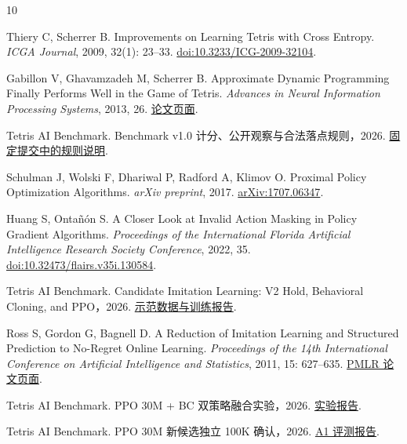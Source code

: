 \documentclass[UTF8,fontset=none,zihao=-4,a4paper]{ctexart}
\newcommand{\1}{\mathbf{1}}
\begin{document}
\begin{thebibliography}{10}
\small

Thiery C, Scherrer B.
Improvements on Learning Tetris with Cross Entropy.
\textit{ICGA Journal}, 2009, 32(1): 23--33.
\href{https://doi.org/10.3233/ICG-2009-32104}{doi:10.3233/ICG-2009-32104}.

Gabillon V, Ghavamzadeh M, Scherrer B.
Approximate Dynamic Programming Finally Performs Well in the Game of Tetris.
\textit{Advances in Neural Information Processing Systems}, 2013, 26.
\href{https://papers.neurips.cc/paper_files/paper/2013/hash/7504adad8bb96320eb3afdd4df6e1f60-Abstract.html}{论文页面}.

Tetris AI Benchmark.
Benchmark v1.0 计分、公开观察与合法落点规则，2026.
\href{https://github.com/u-wyh/tetris-ai-benchmark/blob/c1395ccd7ecc0908ddf5289d1887978e1b87c0b5/tetris-game/README.md}{固定提交中的规则说明}.

Schulman J, Wolski F, Dhariwal P, Radford A, Klimov O.
Proximal Policy Optimization Algorithms.
\textit{arXiv preprint}, 2017.
\href{https://arxiv.org/abs/1707.06347}{arXiv:1707.06347}.

Huang S, Onta\~n\'on S.
A Closer Look at Invalid Action Masking in Policy Gradient Algorithms.
\textit{Proceedings of the International Florida Artificial Intelligence Research Society Conference}, 2022, 35.
\href{https://doi.org/10.32473/flairs.v35i.130584}{doi:10.32473/flairs.v35i.130584}.

Tetris AI Benchmark.
Candidate Imitation Learning: V2 Hold, Behavioral Cloning, and PPO，2026.
\href{https://github.com/u-wyh/tetris-ai-benchmark/blob/c1395ccd7ecc0908ddf5289d1887978e1b87c0b5/reports/experiments/candidate_imitation_learning.md}{示范数据与训练报告}.

Ross S, Gordon G, Bagnell D.
A Reduction of Imitation Learning and Structured Prediction to No-Regret Online Learning.
\textit{Proceedings of the 14th International Conference on Artificial Intelligence and Statistics}, 2011, 15: 627--635.
\href{https://proceedings.mlr.press/v15/ross11a.html}{PMLR 论文页面}.

Tetris AI Benchmark.
PPO 30M + BC 双策略融合实验，2026.
\href{https://github.com/u-wyh/tetris-ai-benchmark/blob/c1395ccd7ecc0908ddf5289d1887978e1b87c0b5/reports/experiments/candidate_ppo30m_bc_hybrid.md}{实验报告}.

Tetris AI Benchmark.
PPO 30M 新候选独立 100K 确认，2026.
\href{https://github.com/u-wyh/tetris-ai-benchmark/blob/c1395ccd7ecc0908ddf5289d1887978e1b87c0b5/reports/experiments/ppo30m_independent_confirmation.md}{A1 评测报告}.


\end{thebibliography}
\end{document}
